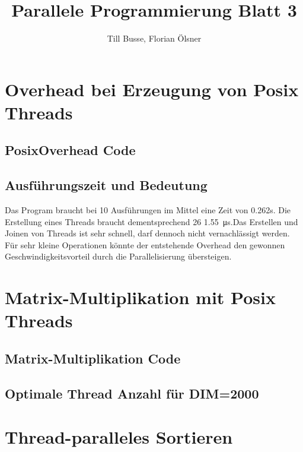 \documentclass[12pt,a4paper]{article}
\author{Till Busse, Florian Ölsner}
\title{Parallele Programmierung Blatt 3}
\begin{document}
\maketitle
\pagebreak
\section{Overhead bei Erzeugung von Posix Threads}
\subsection{PosixOverhead Code}
\lstset{escapechar=@,style=customc}


\subsection{Ausführungszeit und Bedeutung}
Das Program braucht bei 10 Ausführungen im Mittel eine Zeit von 0.262s. Die Erstellung eines Threads braucht dementsprechend 26 \SI{1.55}{\micro\second}.Das Erstellen und Joinen von Threads ist sehr schnell, darf dennoch nicht vernachlässigt werden. Für sehr kleine Operationen könnte der entstehende Overhead den gewonnen Geschwindigkeitsvorteil durch die Parallelisierung übersteigen.
\pagebreak
\section{Matrix-Multiplikation mit Posix Threads}
\subsection{Matrix-Multiplikation Code}

\subsection{Optimale Thread Anzahl für DIM=2000}
\section{Thread-paralleles Sortieren}
\end{document}

